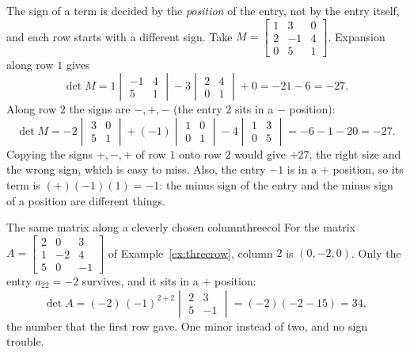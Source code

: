 \documentclass[11pt]{article}
\begin{document}
\begin{warn}
The sign of a term is decided by the \emph{position} of the entry, not by the entry itself, and each row starts with a different sign. Take $M=\begin{bmatrix}1&3&0\\2&-1&4\\0&5&1\end{bmatrix}$. Expansion along row $1$ gives
\[
\det M=1\begin{vmatrix}-1&4\\5&1\end{vmatrix}-3\begin{vmatrix}2&4\\0&1\end{vmatrix}+0=-21-6=-27.
\]
Along row $2$ the signs are $-,+,-$ (the entry $2$ sits in a $-$ position):
\[
\det M=-2\begin{vmatrix}3&0\\5&1\end{vmatrix}+(-1)\begin{vmatrix}1&0\\0&1\end{vmatrix}-4\begin{vmatrix}1&3\\0&5\end{vmatrix}=-6-1-20=-27.
\]
Copying the signs $+,-,+$ of row $1$ onto row $2$ would give $+27$, the right size and the wrong sign, which is easy to miss. Also, the entry $-1$ is in a $+$ position, so its term is $(+)(-1)(1)=-1$: the minus sign of the entry and the minus sign of a position are different things.
\end{warn}

\begin{exmp}{The same matrix along a cleverly chosen column}{threecol}
For the matrix $A=\begin{bmatrix}2&0&3\\1&-2&4\\5&0&-1\end{bmatrix}$ of Example~\ref{ex:threerow}, column $2$ is $(0,-2,0)$. Only the entry $a_{22}=-2$ survives, and it sits in a $+$ position:
\[
\det A=(-2)\,(-1)^{2+2}\begin{vmatrix}2&3\\5&-1\end{vmatrix}=(-2)(-2-15)=34,
\]
the number that the first row gave. One minor instead of two, and no sign trouble.
\end{exmp}
\end{document}
